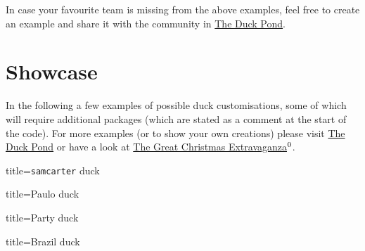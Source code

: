 \documentclass[parskip=half]{scrartcl}
\begin{document}
In case your favourite team is missing from the above examples, feel free to create an example and share it with the community in \href{https://tex.stackexchange.com/q/387047/36296}{The Duck Pond}. 

\clearpage
\section{Showcase}

\addtocounter{footnote}{1}
In the following a few examples of possible duck customisations, some of which will require additional packages (which are stated as a comment at the start of the code). For more examples (or to show your own creations) please visit \href{https://tex.stackexchange.com/q/387047/36296}{The Duck Pond} or have a look at \href{https://vimeo.com/246256860}{The Great Christmas Extravaganza}$^{\thefootnote}$.

\begin{tcblisting}{title={\texttt{samcarter} duck}}
\begin{tikzpicture}
	\duck[body=yellow!50!brown!50!white, 
		longhair=red!50!brown, 
		jacket=blue!50!black]
\end{tikzpicture}
\end{tcblisting}

\begin{tcblisting}{title={Paulo duck}}
\end{tcblisting}

\begin{tcblisting}{title={Party duck}}
\begin{tikzpicture}
  \duck[cake=violet,
  			magichat=violet,
  			magicstars=white!85!yellow]
\end{tikzpicture}	
\end{tcblisting}

\begin{tcblisting}{title={Brazil duck}}
\end{tcblisting}
\end{document}
